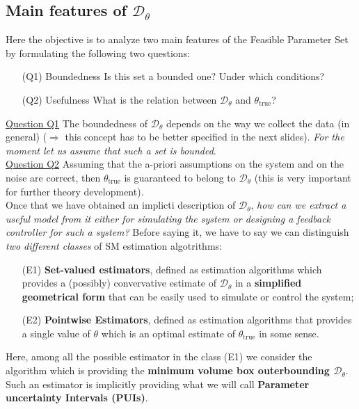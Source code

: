 \subsection{Main features of $\mathcal{D}_\theta$}
Here the objective is to analyze two main features of the Feasible Parameter Set by formulating the following two questions:  
\begin{itemize}
    \itemsep-0.2em
    \item[(Q1)] \textsf{\color{red}Boundedness} Is this set a bounded one? Under which conditions?
    \item[(Q2)] \textsf{\color{red}Usefulness} What is the relation between $\mathcal{D}_\theta$ and $\theta_{\text{true}}$?
\end{itemize}

\noindent
\textsf{\underline{Question Q1}} The boundedness of $\mathcal{D}_\theta$ depends on the way we collect the data (in general) ($\Rightarrow$ this concept has to be better specified in the next slides). \textit{For the moment let us assume that such a set is bounded}.\\

\noindent
\textsf{\underline{Question Q2}} Assuming that the a-priori assumptions on the system and on the noise are correct, then $\theta_{\text{true}}$ is guaranteed to belong to $\mathcal{D}_\theta$ (this is very important for further theory development).\\

\noindent
Once that we have obtained an implicti description of $\mathcal{D}_\theta$, \textit{how can we extract a useful model from it either for simulating the system or designing a feedback controller for such a system?} Before saying it, we have to say we can distinguish \textit{two different classes} of SM estimation algotrithms: 
\begin{itemize}
    \itemsep-0.2em
    \item[(E1)] \textsf{\textbf{\color{red} Set-valued estimators}}, defined as estimation algorithms which provides a (possibly) convervative estimate of $\mathcal{D}_\theta$ in a \textbf{simplified geometrical form} that can be easily used to simulate or control the system; 
    \item[(E2)] \textsf{\textbf{\color{red} Pointwise Estimators}}, defined as estimation algorithms that provides a single value of $\theta$ which is an optimal estimate of $\theta_{\text{true}}$ in some sense.
\end{itemize}
Here, among all the possible estimator in the class (E1) we consider the algorithm which is providing the \textbf{minimum volume box outerbounding $\mathcal{D}_\theta$}. Such an estimator is implicitly providing what we will call \textbf{Parameter uncertainty Intervals (PUIs)}. 


